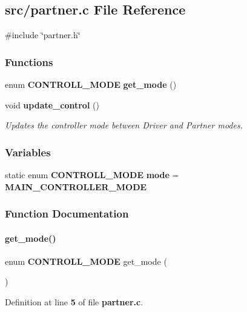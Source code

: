 \subsection{src/partner.c File Reference}
\label{a00137}
{\ttfamily \#include \char`\"{}partner.\+h\char`\"{}}\newline
\subsubsection*{Functions}
\begin{DoxyCompactItemize}
\item 
enum \textbf{ C\+O\+N\+T\+R\+O\+L\+L\+\_\+\+M\+O\+DE} \textbf{ get\+\_\+mode} ()
\item 
void \textbf{ update\+\_\+control} ()
\begin{DoxyCompactList}\small\item\em Updates the controller mode between Driver and Partner modes. \end{DoxyCompactList}\end{DoxyCompactItemize}
\subsubsection*{Variables}
\begin{DoxyCompactItemize}
\item 
static enum \textbf{ C\+O\+N\+T\+R\+O\+L\+L\+\_\+\+M\+O\+DE} \textbf{ mode} = \textbf{ M\+A\+I\+N\+\_\+\+C\+O\+N\+T\+R\+O\+L\+L\+E\+R\+\_\+\+M\+O\+DE}
\end{DoxyCompactItemize}


\subsubsection{Function Documentation}
\mbox{\label{a00137_aacc86d07e59d3b919f5c5eae2ce5d404}} 
\paragraph{get\+\_\+mode()}
{\footnotesize\ttfamily enum \textbf{ C\+O\+N\+T\+R\+O\+L\+L\+\_\+\+M\+O\+DE} get\+\_\+mode (\begin{DoxyParamCaption}{ }\end{DoxyParamCaption})}



Definition at line \textbf{ 5} of file \textbf{ partner.\+c}.



